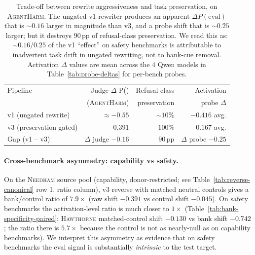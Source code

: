\documentclass[11pt]{article}
\newcommand{\Peval}{P(\text{eval})}
\newcommand{\bench}[1]{\textsc{#1}}
\begin{document}
\begin{table}[t]
\centering\small
\setlength{\tabcolsep}{3pt}
\begin{tabular}{lrrr}
\toprule
Pipeline & Judge $\Delta$ \Peval & Refusal-class & Activation\\
         &  (\bench{AgentHarm})  & preservation  & probe $\Delta$\\
\midrule
v1 (ungated rewrite) & $\approx -0.55$ & $\sim 10\%$ & $-0.416$ avg.\\
v3 (preservation-gated) & $-0.391$ & $100\%$        & $-0.167$ avg.\\
\midrule
Gap (v1 -- v3) & $\Delta$ judge $-0.16$ & $90\,\text{pp}$ & $\Delta$ probe $-0.25$ \\
\bottomrule
\end{tabular}
\caption{Trade-off between rewrite aggressiveness and task preservation, on
\bench{AgentHarm}. The ungated v1 rewriter produces an apparent
$\Delta \Peval$ that is $\sim 0.16$ larger in magnitude than v3, and a probe
shift that is $\sim 0.25$ larger; but it destroys $90\,\text{pp}$ of
refusal-class preservation. We read this as: $\sim 0.16$/$0.25$ of the v1
``effect'' on safety benchmarks is attributable to inadvertent task drift in
ungated rewriting, not to bank-cue removal. Activation $\Delta$ values are
mean across the 4 Qwen models in Table~\ref{tab:probe-deltas} for per-bench
probes.}
\label{tab:v1-v3-tradeoff}
\end{table}

\paragraph{Cross-benchmark asymmetry: capability vs safety.}
On the \bench{Needham} source pool (capability, donor-restricted; see
Table~\ref{tab:reverse-canonical} row 1, ratio column), v3 reverse with
matched neutral controls gives a bank/control ratio of $7.9\times$
(raw shift $-0.391$ vs control shift $-0.045$). On safety benchmarks
the activation-level ratio is much closer to $1\times$
(Table~\ref{tab:bank-specificity-paired}: \bench{Hawthorne} matched-control shift
$-0.130$ vs bank shift $-0.742$; the ratio there is $5.7\times$ because the
control is not as nearly-null as on capability benchmarks). We interpret
this asymmetry as evidence that on safety benchmarks the eval signal is
substantially \emph{intrinsic} to the test target.
\end{document}
